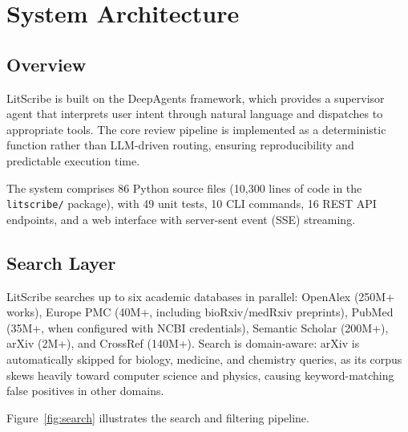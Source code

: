\documentclass[11pt]{article}
\begin{document}
\section{System Architecture}

\subsection{Overview}

LitScribe is built on the DeepAgents framework, which provides a supervisor agent that interprets user intent through natural language and dispatches to appropriate tools. The core review pipeline is implemented as a deterministic function rather than LLM-driven routing, ensuring reproducibility and predictable execution time.

The system comprises 86 Python source files (10,300 lines of code in the \texttt{litscribe/} package), with 49 unit tests, 10 CLI commands, 16 REST API endpoints, and a web interface with server-sent event (SSE) streaming.

\subsection{Search Layer}

LitScribe searches up to six academic databases in parallel: OpenAlex (250M+ works), Europe PMC (40M+, including bioRxiv/medRxiv preprints), PubMed (35M+, when configured with NCBI credentials), Semantic Scholar (200M+), arXiv (2M+), and CrossRef (140M+). Search is domain-aware: arXiv is automatically skipped for biology, medicine, and chemistry queries, as its corpus skews heavily toward computer science and physics, causing keyword-matching false positives in other domains.

Figure~\ref{fig:search} illustrates the search and filtering pipeline.
\end{document}
